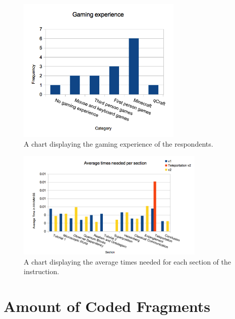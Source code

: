 \documentclass[11pt,twoside]{report} %
\begin{document}
\begin{figure}[htb!]
\centering
\includegraphics[width=0.7\textwidth]{gamingexperiencechart}
\caption{A chart displaying the gaming experience of the respondents.}
\label{fig:gamingexperiencechart}
\end{figure}

\begin{figure}[htb!]
\centering
\includegraphics[width=0.8\textwidth]{timeschart}
\caption{A chart displaying the average times needed for each section of the instruction.}
\label{fig:timeschart}
\end{figure}

\newpage
\FloatBarrier

\chapter{Amount of Coded Fragments}
\end{document}
